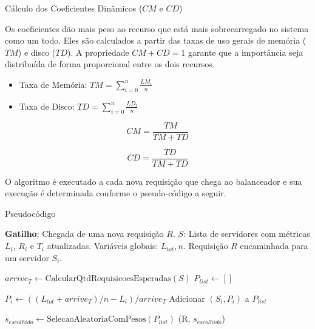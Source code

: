 \documentclass[10pt]{beamer}
\begin{document}
\begin{frame}{Cálculo dos Coeficientes Dinâmicos ($CM$ e $CD$)}

Os coeficientes dão mais peso ao recurso que está mais sobrecarregado no sistema como um todo. Eles são calculados a partir das taxas de uso gerais de memória ($TM$) e disco ($TD$). A propriedade $CM + CD = 1$ garante que a importância seja distribuída de forma proporcional entre os dois recursos.

\bigskip

\begin{itemize}
    \item Taxa de Memória: $TM = \sum_{i=0}^n \frac{LM_i}{n}$
    \bigskip
    \item Taxa de Disco: $TD = \sum_{i=0}^n \frac{LD_i}{n}$
\end{itemize}

\bigskip

\noindent
\begin{minipage}{.48\textwidth}
    \begin{equation}
        CM = \frac{TM}{TM + TD} \label{eq:cm}
    \end{equation}
\end{minipage}
\hfill
\begin{minipage}{.48\textwidth}
    \begin{equation}
        CD = \frac{TD}{TM + TD} \label{eq:cd}
    \end{equation}
\end{minipage}

O algoritmo é executado a cada nova requisição que chega ao balanceador e sua execução é determinada conforme o pseudo-código a seguir.

\end{frame}

\begin{frame}{Pseudocódigo}
    \begin{algorithm}[H]
    \caption{Seleção de Servidor por Requisição}
    \begin{algorithmic}[1]
    \Statex \textbf{Gatilho}: Chegada de uma nova requisição $R$.
    \Require
        \Statex $S$: Lista de servidores com métricas $L_i$, $R_i$ e $T_i$ atualizadas.
        \Statex Variáveis globais: $L_{tot}, n$.
    \Ensure
        \Statex Requisição $R$ encaminhada para um servidor $S_{i}$.
    
        \State $arrive_T \leftarrow \text{CalcularQtdRequisicoesEsperadas}(S)$
        \State $P_{list} \leftarrow []$ 
        
            \State $P_i \leftarrow ((L_{tot} + arrive_T)/n - L_i) / arrive_T$ 
            \State Adicionar $(S_i, P_i)$ a $P_{list}$
        \EndFor
        
        \State $s_{escolhido} \leftarrow \text{SelecaoAleatoriaComPesos}(P_{list})$
        \State {}(R, $s_{escolhido}$)
    \EndProcedure
    \end{algorithmic}
    \end{algorithm}
\end{frame}
\end{document}
